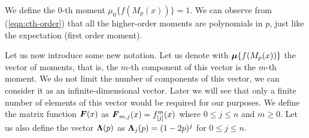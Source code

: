 \documentclass{article}
\def\vec#1{\mathchoice{\mbox{\boldmath$\displaystyle#1$}}
  {\mbox{\boldmath$\textstyle#1$}}
  {\mbox{\boldmath$\scriptstyle#1$}}
  {\mbox{\boldmath$\scriptscriptstyle#1$}}}
\begin{document}
We define the $0$-th moment $\mu_0\{f(M_p(x))\}=1$. We can observe from (\ref{eqn:cth-order}) that all the higher-order moments are polynomials in $p$, just like the expectation (first order moment). 

Let us now introduce some new notation. Let us denote with $\vec{\mu}\{f(M_p(x))\}$ the vector of moments, that is, the $m$-th component of this vector is the $m$-th moment. We do not limit the number of components of this vector, we can consider it as an infinite-dimensional vector. Later we will see that only a finite number of elements of this vector would be required for our purposes. We define the matrix function $\vec{F}(x)$ as $\vec{F}_{m,j}(x) = f^m_{[j]}(x)$ where $0 \leq j \leq n$ and $m\geq0$. Let us also define the vector $\vec{\Lambda}(p)$ as $\vec{\Lambda}_j(p)=(1-2p)^j$ for $0 \leq j \leq n$. 
\end{document}
